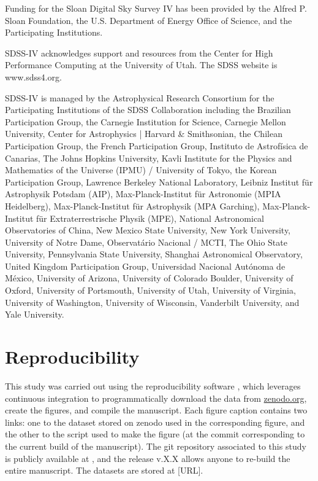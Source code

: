 \documentclass[twocolumn,linenumbers,twocolappendix]{aastex631}
\begin{document}
\begin{acknowledgments}

Funding for the Sloan Digital Sky 
Survey IV has been provided by the 
Alfred P. Sloan Foundation, the U.S. 
Department of Energy Office of 
Science, and the Participating 
Institutions. 

SDSS-IV acknowledges support and 
resources from the Center for High 
Performance Computing  at the 
University of Utah. The SDSS 
website is www.sdss4.org.

SDSS-IV is managed by the 
Astrophysical Research Consortium 
for the Participating Institutions 
of the SDSS Collaboration including 
the Brazilian Participation Group, 
the Carnegie Institution for Science, 
Carnegie Mellon University, Center for 
Astrophysics | Harvard \& 
Smithsonian, the Chilean Participation 
Group, the French Participation Group, 
Instituto de Astrof\'isica de 
Canarias, The Johns Hopkins 
University, Kavli Institute for the 
Physics and Mathematics of the 
Universe (IPMU) / University of 
Tokyo, the Korean Participation Group, 
Lawrence Berkeley National Laboratory, 
Leibniz Institut f\"ur Astrophysik 
Potsdam (AIP),  Max-Planck-Institut 
f\"ur Astronomie (MPIA Heidelberg), 
Max-Planck-Institut f\"ur 
Astrophysik (MPA Garching), 
Max-Planck-Institut f\"ur 
Extraterrestrische Physik (MPE), 
National Astronomical Observatories of 
China, New Mexico State University, 
New York University, University of 
Notre Dame, Observat\'ario 
Nacional / MCTI, The Ohio State 
University, Pennsylvania State 
University, Shanghai 
Astronomical Observatory, United 
Kingdom Participation Group, 
Universidad Nacional Aut\'onoma 
de M\'exico, University of Arizona, 
University of Colorado Boulder, 
University of Oxford, University of 
Portsmouth, University of Utah, 
University of Virginia, University 
of Washington, University of 
Wisconsin, Vanderbilt University, 
and Yale University.

\end{acknowledgments}

\appendix

\section{Reproducibility}
\label{app:reproducibility}

This study was carried out using the reproducibility software
\href{https://github.com/showyourwork/showyourwork}{\showyourwork}
\citep{Luger2021-showyourwork}, which leverages continuous integration to
programmatically download the data from
\href{https://zenodo.org/}{zenodo.org}, create the figures, and
compile the manuscript. Each figure caption contains two links: one
to the dataset stored on zenodo used in the corresponding figure,
and the other to the script used to make the figure (at the commit
corresponding to the current build of the manuscript). The git
repository associated to this study is publicly available at
\GitHubURL, and the release v.X.X allows anyone to re-build the entire 
manuscript. The datasets are stored at [URL].


\end{document}
